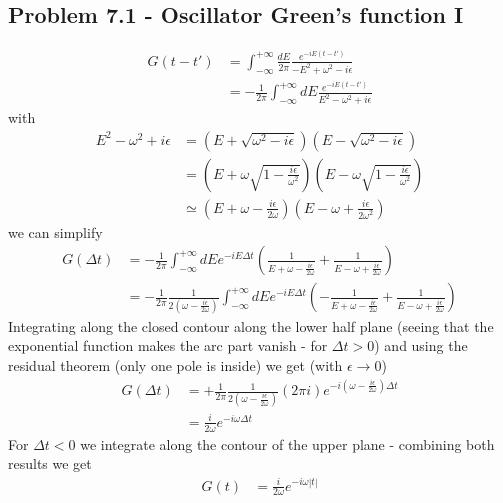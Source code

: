 \documentclass[10pt,a4paper]{book}
\theoremstyle{definition}
\begin{document}
\subsection{Problem 7.1 - Oscillator Green's function I}
\begin{align}
G(t-t')&=\int_{-\infty}^{+\infty}\frac{dE}{2\pi}\frac{e^{-iE(t-t')}}{-E^2+\omega^2-i\epsilon}\\
&=-\frac{1}{2\pi}\int_{-\infty}^{+\infty}dE\frac{e^{-iE(t-t')}}{E^2-\omega^2+i\epsilon}
\end{align}
with
\begin{align}
E^2-\omega^2+i\epsilon
&=(E+\sqrt{\omega^2-i\epsilon})(E-\sqrt{\omega^2-i\epsilon})\\
&=\left(E+\omega\sqrt{1-\frac{i\epsilon}{\omega^2}}\right)\left(E-\omega\sqrt{1-\frac{i\epsilon}{\omega^2}}\right)\\
&\simeq\left(E+\omega-\frac{i\epsilon}{2\omega}\right)\left(E-\omega+\frac{i\epsilon}{2\omega^2}\right)
\end{align}
we can simplify
\begin{align}
G(\Delta t)
&=-\frac{1}{2\pi}\int_{-\infty}^{+\infty}dEe^{-iE\Delta t}\left(\frac{1}{E+\omega-\frac{i\epsilon}{2\omega}}+\frac{1}{E-\omega+\frac{i\epsilon}{2\omega}}\right)\\
&=-\frac{1}{2\pi}\frac{1}{2\left(\omega-\frac{i\epsilon}{2\omega}\right)}\int_{-\infty}^{+\infty}dEe^{-iE\Delta t}\left(-\frac{1}{E+\omega-\frac{i\epsilon}{2\omega}}+\frac{1}{E-\omega+\frac{i\epsilon}{2\omega}}\right)
\end{align}
Integrating along the closed contour along the lower half plane (seeing that the exponential function makes the arc part vanish - for $\Delta t>0$) and using the residual theorem (only one pole is inside) we get (with $\epsilon\rightarrow0$)
\begin{align}
G(\Delta t)
&=+\frac{1}{2\pi}\frac{1}{2\left(\omega-\frac{i\epsilon}{2\omega}\right)}(2\pi i)e^{-i(\omega-\frac{i\epsilon}{2\omega})\Delta t}\\
&=\frac{i}{2\omega}e^{-i\omega\Delta t}
\end{align}
For $\Delta t<0$ we integrate along the contour of the upper plane - combining both results we get
\begin{align}
G(t)&=\frac{i}{2\omega}e^{-i\omega|t|}
\end{align}
\end{document}
